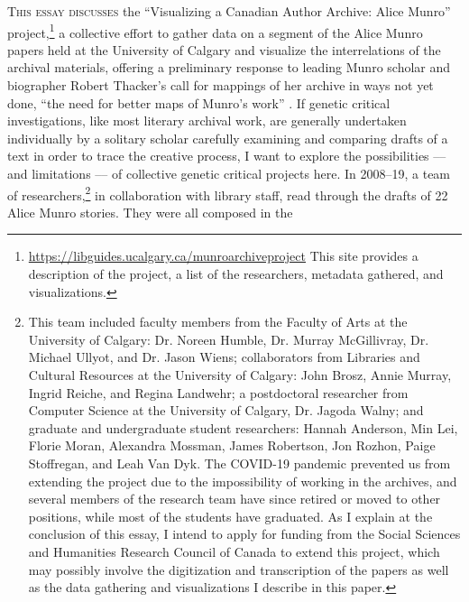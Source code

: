 \begin{paper}
\begin{quote}
\begin{flushright}
    \parencite[196]{thacker_reading_2016}
\end{flushright}
    
\end{quote}

\noindent \textsc{This essay discusses} the ``Visualizing a Canadian Author Archive: Alice
Munro'' project,\footnote{\url{https://libguides.ucalgary.ca/munroarchiveproject}
  This site provides a description of the project, a list of the
  researchers, metadata gathered, and visualizations.} a collective
effort to gather data on a segment of the Alice Munro papers held at the
University of Calgary and visualize the interrelations of the archival
materials, offering a preliminary response to leading Munro scholar and
biographer Robert Thacker's call for mappings of her archive in ways not
yet done, ``the need for better maps of Munro's work'' \citep[194]{thacker_reading_2016}. If
genetic critical investigations, like most literary archival work, are
generally undertaken individually by a solitary scholar carefully
examining and comparing drafts of a text in order to trace the creative
process, I want to explore the possibilities –– and limitations –– of
collective genetic critical projects here. In 2008--19, a team of researchers,\footnote{This team included faculty members
  from the Faculty of Arts at the University of Calgary: Dr. Noreen
  Humble, Dr. Murray McGillivray, Dr. Michael Ullyot, and Dr. Jason
  Wiens; collaborators from Libraries and Cultural Resources at the
  University of Calgary: John Brosz, Annie Murray, Ingrid Reiche, and
  Regina Landwehr; a postdoctoral researcher from Computer Science at
  the University of Calgary, Dr. Jagoda Walny; and graduate and
  undergraduate student researchers: Hannah Anderson, Min Lei, Florie
  Moran, Alexandra Mossman, James Robertson, Jon Rozhon, Paige
  Stoffregan, and Leah Van Dyk. The COVID-19 pandemic prevented us from
  extending the project due to the impossibility of working in the
  archives, and several members of the research team have since retired
  or moved to other positions, while most of the students have
  graduated. As I explain at the conclusion of this essay, I intend to
  apply for funding from the Social Sciences and Humanities Research
  Council of Canada to extend this project, which may possibly involve
  the digitization and transcription of the papers as well as the data
  gathering and visualizations I describe in this paper.} in collaboration with library
staff,
read through the drafts of 22 Alice Munro stories. They were all composed in the

\end{paper}
